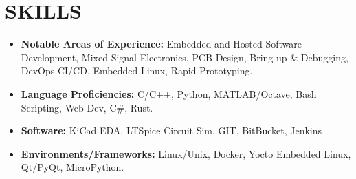 
\section{SKILLS}
\begin{minipage}{\maincolumnwidth}%
	\small{
    	\begin{itemize}
        \item \textbf{Notable Areas of Experience:} Embedded and Hosted Software Development, Mixed Signal Electronics, PCB Design, Bring-up \& Debugging, DevOps CI/CD, Embedded Linux, Rapid Prototyping.
        \item \textbf{Language Proficiencies:} C/C++, Python, MATLAB/Octave, Bash Scripting, Web Dev, C\#, Rust.
        \item \textbf{Software:} KiCad EDA, LTSpice Circuit Sim, GIT, BitBucket, Jenkins
        \item \textbf{Environments/Frameworks:} Linux/Unix, Docker, Yocto Embedded Linux, Qt/PyQt, MicroPython.
		\end{itemize}}%
\end{minipage}
      



